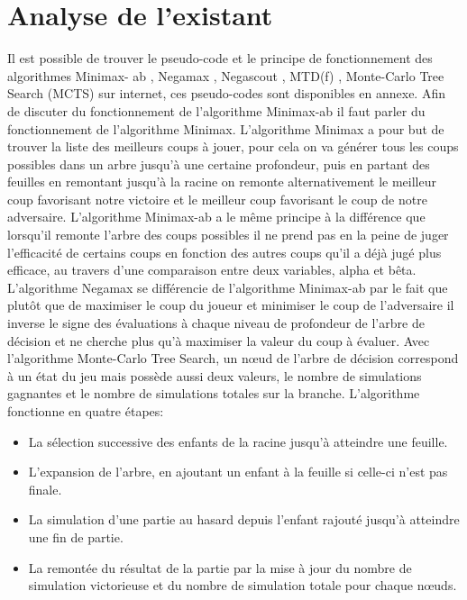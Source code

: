 \documentclass{article}
\begin{document}
\section{Analyse de l'existant}
Il est possible de trouver le pseudo-code et le principe de fonctionnement des algorithmes Minimax-
ab \cite{Minmax-ab}, Negamax \cite{Negamax}, Negascout \cite{Negascout}, MTD(f) \cite{MTD(f)}, Monte-Carlo Tree Search (MCTS)\cite{MCTS} sur internet, ces pseudo-codes sont disponibles en annexe.
\newline
Afin de discuter du fonctionnement de l'algorithme Minimax-ab il faut parler du fonctionnement de l'algorithme Minimax.
\newline
L'algorithme Minimax a pour but de trouver la liste des meilleurs coups à jouer, pour cela on va générer tous les coups possibles dans un arbre jusqu'à une certaine profondeur,  puis en partant des feuilles en remontant jusqu'à la racine on remonte alternativement le meilleur coup favorisant notre victoire et le meilleur coup favorisant le coup de notre adversaire\cite{Heuristiques}.
\newline\newline
L'algorithme Minimax-ab a le même principe à la différence que lorsqu'il remonte l'arbre des coups possibles il ne prend pas en la peine de juger l'efficacité de certains coups en fonction des autres coups qu'il a déjà jugé plus efficace, au travers d'une comparaison entre deux variables, alpha et bêta\cite{Heuristiques}.
\newline\newline
L'algorithme Negamax se différencie de l'algorithme Minimax-ab par le fait que plutôt que de maximiser le coup du joueur et minimiser le coup de l'adversaire il inverse le signe des évaluations à chaque niveau de profondeur de l'arbre de décision et ne cherche plus qu'à maximiser la valeur du coup à évaluer\cite{Negamax}.
\newline\newline
Avec l'algorithme Monte-Carlo Tree Search, un nœud de l'arbre de décision correspond à un état du jeu mais possède aussi deux valeurs, le nombre de simulations gagnantes et le nombre de simulations totales sur la branche.
L'algorithme fonctionne en quatre étapes\cite{MonteCarlo}:
\begin{itemize}
\item La sélection successive des enfants de la racine jusqu'à atteindre une feuille.
\item L'expansion de l'arbre, en ajoutant un enfant à la feuille si celle-ci n'est pas finale.
\item La simulation d'une partie au hasard depuis l'enfant rajouté jusqu'à atteindre une fin de partie.
\item La remontée du résultat de la partie par la mise à jour du nombre de simulation victorieuse et du nombre de simulation totale pour chaque nœuds.
\end{itemize}
\end{document}
